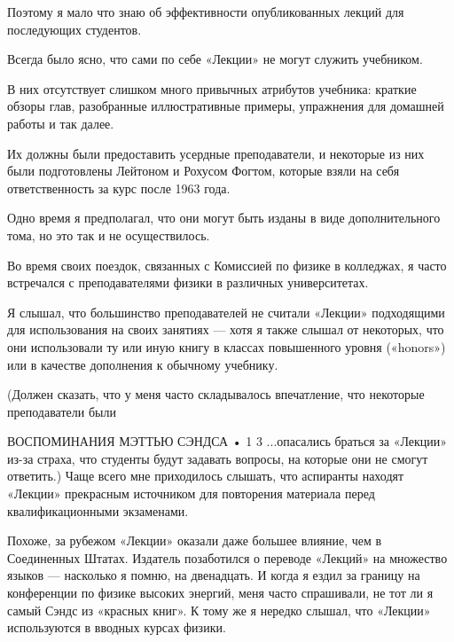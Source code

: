 \documentclass[11pt,oneside]{article}
\begin{document}
Поэтому я мало что знаю об эффективности опубликованных лекций для последующих студентов.\par



Всегда было ясно, что сами по себе «Лекции» не могут служить учебником.\par



В них отсутствует слишком много привычных атрибутов учебника: краткие обзоры глав, разобранные иллюстративные примеры, упражнения для домашней работы и так далее.\par



Их должны были предоставить усердные преподаватели, и некоторые из них были подготовлены Лейтоном и Рохусом Фогтом, которые взяли на себя ответственность за курс после 1963 года.\par



Одно время я предполагал, что они могут быть изданы в виде дополнительного тома, но это так и не осуществилось.\par



Во время своих поездок, связанных с Комиссией по физике в колледжах, я часто встречался с преподавателями физики в различных университетах.\par



Я слышал, что большинство преподавателей не считали «Лекции» подходящими для использования на своих занятиях --- хотя я также слышал от некоторых, что они использовали ту или иную книгу в классах повышенного уровня («honors») или в качестве дополнения к обычному учебнику.\par



(Должен сказать, что у меня часто складывалось впечатление, что некоторые преподаватели были\par



ВОСПОМИНАНИЯ МЭТТЬЮ СЭНДСА • 1 3 ...опасались браться за «Лекции» из-за страха, что студенты будут задавать вопросы, на которые они не смогут ответить.) Чаще всего мне приходилось слышать, что аспиранты находят «Лекции» прекрасным источником для повторения материала перед квалификационными экзаменами.\par



Похоже, за рубежом «Лекции» оказали даже большее влияние, чем в Соединенных Штатах. Издатель позаботился о переводе «Лекций» на множество языков --- насколько я помню, на двенадцать. И когда я ездил за границу на конференции по физике высоких энергий, меня часто спрашивали, не тот ли я самый Сэндс из «красных книг». К тому же я нередко слышал, что «Лекции» используются в вводных курсах физики.\par
\end{document}
